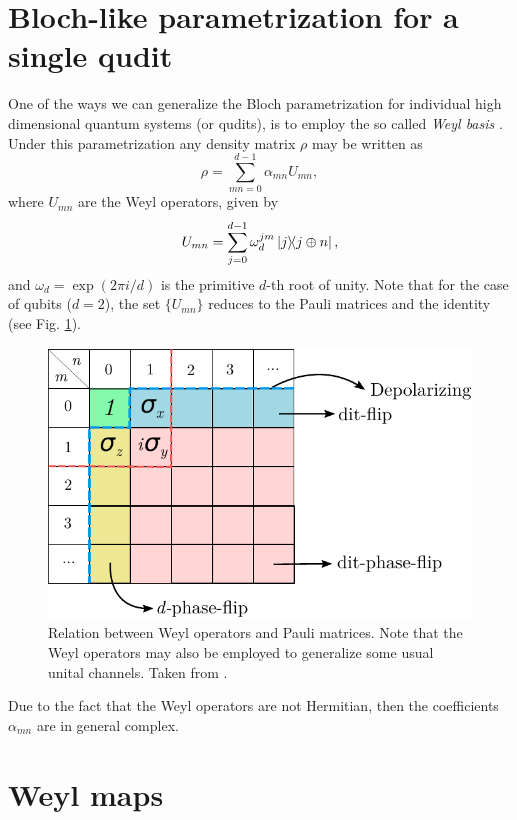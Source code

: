 \section{Bloch-like parametrization for a single qudit} %
% 
One of the ways we can generalize the Bloch parametrization for individual high dimensional quantum systems (or qudits), is to employ the so called \textit{Weyl basis} \cite{Bertlmann2008}. Under this parametrization any density matrix $\rho$ may be written as
% 
\begin{equation}
\rho=\sum_{mn=0}^{d-1} \alpha_{mn} U_{mn},
\label{rho}
\end{equation}
% 
where $U_{mn}$ are the Weyl operators, given by
% 
\begin{equation}
U_{mn}=\sum_{j=0}^{d-1}\omega_d^{j m}\dyad{j}{j\oplus n},
\label{Umn}
\end{equation}
% 
and $\omega_d=\exp(2\pi i/d)$ is the primitive $d$-th root of unity. Note that for the case of qubits ($d=2$), the set $\{U_{mn}\}$ reduces to the Pauli matrices and the identity (see Fig. \ref{Weyl_Pauli}).

\begin{figure}[h]
  \centering
  \includegraphics[scale=0.65]{Weyl_2.pdf}
  \caption{Relation between Weyl operators and Pauli matrices. Note that the Weyl operators may also be employed to generalize some usual unital channels. Taken from \cite{Fonseca2019}.}
  \label{Weyl_Pauli}
\end{figure}
% 
Due to the fact that the Weyl operators are not Hermitian, then the coefficients $\alpha_{mn}$ are in general complex.
\section{Weyl maps} %

